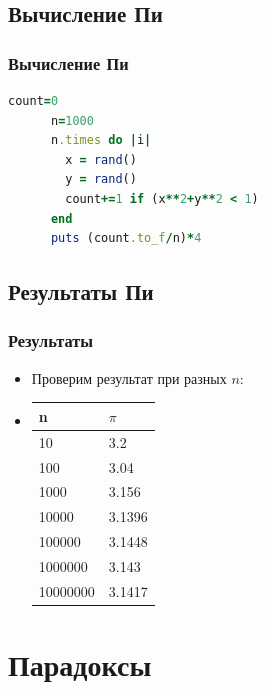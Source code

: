 \documentclass[compress,red]{beamer}
\begin{document}
\subsection{Вычисление Пи}
\begin{frame}[fragile]
  \frametitle{Вычисление Пи}
    \scriptsize{
    \begin{lstlisting}[language=ruby,basicstyle=\footnotesize,label=ruby2,caption=Вычисление Пи]
      count=0
      n=1000
      n.times do |i|
        x = rand()
        y = rand()
        count+=1 if (x**2+y**2 < 1)
      end
      puts (count.to_f/n)*4
    \end{lstlisting}
    }
\end{frame}

\subsection{Результаты Пи}
\begin{frame}[fragile]
  \frametitle{Результаты}
  \begin{itemize}
    \item Проверим результат при разных $n$:
    \item
    \begin{tabular}{|l|l|}
      \hline
      n & $\pi$ \\
      \hline
      10 & 3.2 \\
      \hline
      100 & 3.04 \\
      \hline
      1000 & 3.156 \\
      \hline
      10000 & 3.1396 \\
      \hline
      100000 & 3.1448 \\
      \hline
      1000000 & 3.143 \\
      \hline
      10000000 & 3.1417 \\
      \hline
    \end{tabular}
  \end{itemize}
\end{frame}

\section{Парадоксы}
\end{document}
